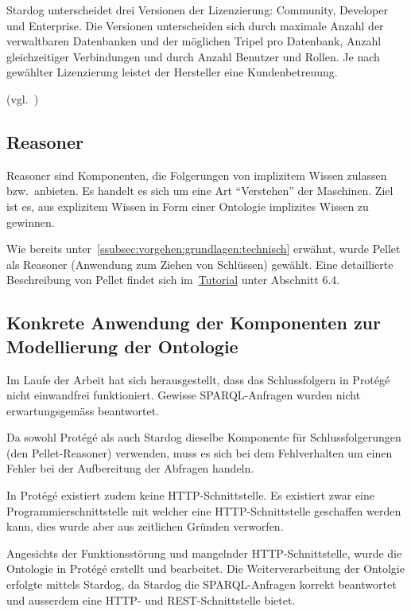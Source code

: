 Stardog unterscheidet drei Versionen der Lizenzierung: Community, Developer und Enterprise. Die Versionen unterscheiden sich durch maximale Anzahl der verwaltbaren Datenbanken und der möglichen Tripel pro Datenbank, Anzahl gleichzeitiger Verbindungen und durch Anzahl Benutzer und Rollen. Je nach gewählter Lizenzierung leistet der Hersteller eine Kundenbetreuung.

(vgl.~\cite{stardogDocu})

\subsection{Reasoner}
\label{subsec:komponenten_reasoner}
Reasoner sind Komponenten,  die Folgerungen von implizitem Wissen zulassen bzw.\ anbieten. Es handelt es sich um eine Art ``Verstehen'' der Maschinen. Ziel ist es, aus explizitem Wissen in Form einer Ontologie implizites Wissen zu gewinnen.

Wie bereits unter~\autoref{ssubsec:vorgehen:grundlagen:technisch} erwähnt, wurde Pellet als Reasoner (Anwendung zum Ziehen von Schlüssen) gewählt. Eine detaillierte Beschreibung von Pellet findet sich im~\hyperref[sec:anhang:tutorial_dokument]{Tutorial} unter Abschnitt 6.4.

\subsection{Konkrete Anwendung der Komponenten zur Modellierung der Ontologie}
\label{subsec:komponenten_anwendung}
Im Laufe der Arbeit hat sich herausgestellt, dass das Schlussfolgern in Protégé nicht einwandfrei funktioniert. Gewisse SPARQL-Anfragen wurden nicht erwartungsgemäss beantwortet.

Da sowohl Protégé als auch Stardog dieselbe Komponente für Schlussfolgerungen (den Pellet-Reasoner) verwenden, muss es sich bei dem Fehlverhalten um einen Fehler bei der Aufbereitung der Abfragen handeln.

In Protégé existiert zudem keine HTTP-Schnittstelle. Es existiert zwar eine Programmierschnittstelle mit welcher eine HTTP-Schnittstelle geschaffen werden kann, dies wurde aber aus zeitlichen Gründen verworfen.

Angesichts der Funktionsstörung und mangelnder HTTP-Schnittstelle, wurde die Ontologie in Protégé erstellt und bearbeitet. Die Weiterverarbeitung der Ontolgie erfolgte mittels Stardog, da Stardog die SPARQL-Anfragen korrekt beantwortet und ausserdem eine HTTP- und REST-Schnittstelle bietet.

